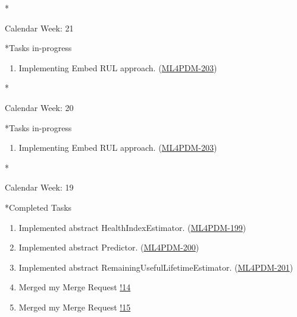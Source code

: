 \documentclass[11pt,a4paper]{article}
\begin{document}
\newpage
\begin{section}*{Calendar Week: 21 \hfill \date{28 May, 2021}}
 \begin{refsection}
   \begin{subsection}*{Tasks in-progress}
     \begin{enumerate}
       \item
             Implementing Embed RUL approach. (\href{https://ml4pdm.atlassian.net/browse/ML4PDM-203}{ML4PDM-203})
     \end{enumerate}
   \end{subsection}
 \end{refsection}
\end{section}

\newpage
\begin{section}*{Calendar Week: 20 \hfill \date{21 May, 2021}}
 \begin{refsection}
   \begin{subsection}*{Tasks in-progress}
     \begin{enumerate}
       \item
             Implementing Embed RUL approach. (\href{https://ml4pdm.atlassian.net/browse/ML4PDM-203}{ML4PDM-203})
     \end{enumerate}
   \end{subsection}
 \end{refsection}
\end{section}

\newpage
\begin{section}*{Calendar Week: 19 \hfill \date{14 May, 2021}}
 \begin{refsection}
   \begin{subsection}*{Completed Tasks}
     \begin{enumerate}
       \item
             Implemented abstract HealthIndexEstimator. (\href{https://ml4pdm.atlassian.net/browse/ML4PDM-199}{ML4PDM-199})
       \item
             Implemented abstract Predictor. (\href{https://ml4pdm.atlassian.net/browse/ML4PDM-200}{ML4PDM-200})
       \item
             Implemented abstract RemainingUsefulLifetimeEstimator. (\href{https://ml4pdm.atlassian.net/browse/ML4PDM-201}{ML4PDM-201})
       \item
             Merged my Merge Request \href{https://git.cs.uni-paderborn.de/machine-learning-for-predictive-maintenance/code/-/merge_requests/14}{!14}
       \item
             Merged my Merge Request \href{https://git.cs.uni-paderborn.de/machine-learning-for-predictive-maintenance/code/-/merge_requests/15}{!15}
     \end{enumerate}
   \end{subsection}
 \end{refsection}
\end{section}
\end{document}
